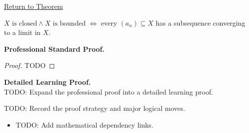 \newpage
{}
\label{prf:heine-borel}

\begin{remark*}[Return]
\hyperref[thm:heine-borel]{Return to Theorem}
\end{remark*}

\begin{theorem*}
$X\text{ is closed} \wedge X\text{ is bounded}$ $\iff$ every $(a_n)\subseteq X$ has a subsequence converging to a limit in $X$.
\end{theorem*}

\textbf{Professional Standard Proof.}~\\
\begin{proof}
TODO
\end{proof}

\textbf{Detailed Learning Proof.}~\\
TODO: Expand the professional proof into a detailed learning proof.

\begin{remark*}
TODO: Record the proof strategy and major logical moves.
\end{remark*}

\begin{dependencies}
\begin{itemize}
  \item TODO: Add mathematical dependency links.
\end{itemize}
\end{dependencies}
